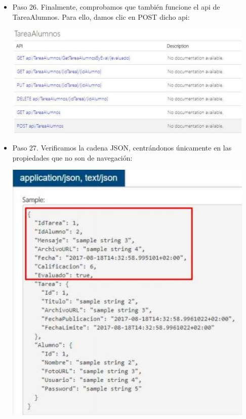 \begin{flushleft}
\begin{itemize}
\item Paso 26.  Finalmente, comprobamos que también funcione el api de TareaAlumnos. Para ello, damos clic
en POST dicho api:
\begin{center}
	\includegraphics[width=12cm]{./Imagenes/paso26} 
	\end{center}

\item Paso 27.  Verificamos la cadena JSON, centrándonos únicamente en las propiedades que no son de
navegación:
\begin{center}
	\includegraphics[width=12cm]{./Imagenes/paso27} 
	\end{center}




\end{itemize}
\end{flushleft}
